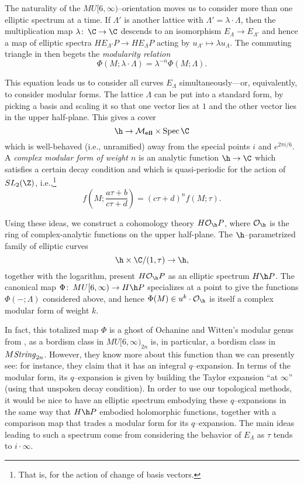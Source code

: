 \begin{example}
The naturality of the $MU[6, \infty)$--orientation moves us to consider more than one elliptic spectrum at a time.  If $\Lambda'$ is another lattice with $\Lambda' = \lambda \cdot \Lambda$, then the multiplication map $\lambda\co \C \to \C$ descends to an isomorphism $E_\Lambda \to E_{\Lambda'}$ and hence a map of elliptic spectra $HE_{\Lambda'}P \to HE_\Lambda P$ acting by $u_{\Lambda'} \mapsto \lambda u_\Lambda$.  The commuting triangle in  then begets the \emph{modularity relation} \[\Phi(M; \lambda \cdot \Lambda) = \lambda^{-n} \Phi(M; \Lambda).\]
\end{example}

\begin{example}\label{OrdinaryHomologyInUpperHalfPlaneEx}
This equation leads us to consider all curves $E_\Lambda$ simultaneously---or, equivalently, to consider modular forms.  The lattice $\Lambda$ can be put into a standard form, by picking a basis and scaling it so that one vector lies at $1$ and the other vector lies in the upper half-plane.  This gives a cover \[\h \to \moduli{ell} \times \Spec \C\] which is well-behaved (i.e., unramified) away from the special points $i$ and $e^{2 \pi i / 6}$.  A \textit{complex modular form of weight $n$} is an analytic function $\h \to \C$ which satisfies a certain decay condition and which is quasi-periodic for the action of $SL_2(\Z)$, i.e.,\footnote{That is, for the action of change of basis vectors.} \[f\left(M; \frac{a \tau + b}{c \tau + d} \right) = (c \tau + d)^n f(M; \tau).\]

Using these ideas, we construct a cohomology theory $H \sheaf O_{\h} P$, where $\sheaf O_{\h}$ is the ring of complex-analytic functions on the upper half-plane.  The $\h$--parametrized family of elliptic curves \[\h \times \C / (1, \tau) \to \h,\] together with the logarithm, present $H \sheaf O_{\h} P$ as an elliptic spectrum $H\h P$.  The canonical map $\Phi\co MU[6, \infty) \to H\h P$ specializes at a point to give the functions $\Phi(-; \Lambda)$ considered above, and hence $\Phi(M) \in u^k \cdot \sheaf O_{\h}$ is itself a complex modular form of weight $k$.
\end{example}

In fact, this totalized map $\Phi$ is a ghost of Ochanine and Witten's modular genus from , as a bordism class in $MU[6, \infty)_{2n}$ is, in particular, a bordism class in $M\mathit{String}_{2n}$.  However, they know more about this function than we can presently see: for instance, they claim that it has an integral $q$--expansion.  In terms of the modular form, its $q$--expansion is given by building the Taylor expansion ``at $\infty$'' (using that unspoken decay condition).  In order to use our topological methods, it would be nice to have an elliptic spectrum embodying these $q$--expansions in the same way that $H\h P$ embodied holomorphic functions, together with a comparison map that trades a modular form for its $q$--expansion.  The main ideas leading to such a spectrum come from considering the behavior of $E_\Lambda$ as $\tau$ tends to $i \cdot \infty$.

